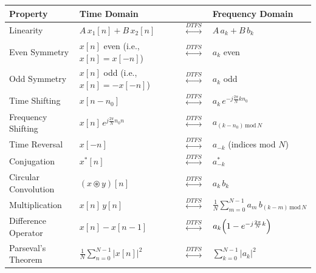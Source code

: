 \begin{table}[ht]
        \label{tab:dtfourier_properties}
    \begin{tabular}{llll}
        \toprule
        \textbf{Property}    & \textbf{Time Domain}                    &                                     & \textbf{Frequency Domain}                                       \\
        \midrule
        Linearity            & \(A\,x_1[n] + B\,x_2[n]\)               & \(\overset{DTFS}{\leftrightarrow}\) & \(A\,a_k + B\,b_k\)                                             \\
        Even Symmetry        & \(x[n]\) even (i.e., \(x[n]=x[-n]\))    & \(\overset{DTFS}{\leftrightarrow}\) & \(a_k\) even                                                    \\
        Odd Symmetry         & \(x[n]\) odd (i.e., \(x[n]=-x[-n]\))    & \(\overset{DTFS}{\leftrightarrow}\) & \(a_k\) odd                                                     \\
        Time Shifting        & \(x[n-n_0]\)                            & \(\overset{DTFS}{\leftrightarrow}\) & \(a_k\,e^{-j\frac{2\pi}{N} k n_0}\)                             \\
        Frequency Shifting   & \(x[n]\,e^{j\frac{2\pi}{N} n_0 n}\)     & \(\overset{DTFS}{\leftrightarrow}\) & \(a_{(k-n_0)\,\mathrm{mod}\,N}\)                                \\
        Time Reversal        & \(x[-n]\)                               & \(\overset{DTFS}{\leftrightarrow}\) & \(a_{-k}\) (indices mod \(N\))                                  \\
        Conjugation          & \(x^*[n]\)                              & \(\overset{DTFS}{\leftrightarrow}\) & \(a^*_{-k}\)                                                    \\
        Circular Convolution & \((x\circledast y)[n]\)                 & \(\overset{DTFS}{\leftrightarrow}\) & \(a_k\,b_k\)                                                    \\
        Multiplication       & \(x[n]\,y[n]\)                          & \(\overset{DTFS}{\leftrightarrow}\) & \(\frac{1}{N}\sum_{m=0}^{N-1} a_m\,b_{(k-m)\,\mathrm{mod}\,N}\) \\
        Difference Operator  & \(x[n]-x[n-1]\)                         & \(\overset{DTFS}{\leftrightarrow}\) & \(a_k\Bigl(1-e^{-j\frac{2\pi}{N} k}\Bigr)\)                     \\
        Parseval's Theorem   & \(\frac{1}{N}\sum_{n=0}^{N-1}|x[n]|^2\) & \(\overset{DTFS}{\leftrightarrow}\) & \(\sum_{k=0}^{N-1}|a_k|^2\)                                     \\
        \bottomrule
    \end{tabular}
\end{table}